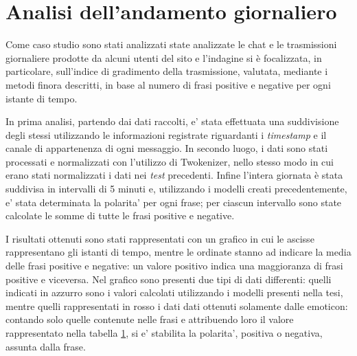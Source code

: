 \documentclass[a4paper,12pt,openright,twoside]{report}
\theoremstyle{definition}
\begin{document}

\section{Analisi dell'andamento giornaliero}
Come caso studio sono stati analizzati state analizzate le chat e le trasmissioni giornaliere prodotte da alcuni utenti
del sito
e l’indagine si è focalizzata, in particolare, sull’indice di gradimento della trasmissione,  valutata, mediante i metodi finora descritti, in base al numero di frasi positive e negative per ogni istante di tempo.

In prima analisi, partendo dai dati raccolti, e' stata effettuata una suddivisione degli stessi utilizzando
le informazioni registrate riguardanti i \emph{timestamp} e il canale di appartenenza di ogni messaggio.
In secondo luogo, i dati sono stati processati e normalizzati con l'utilizzo di Twokenizer, nello stesso modo
in cui erano stati normalizzati i dati nei \emph{test} precedenti.
Infine l'intera giornata è stata suddivisa in intervalli di 5 minuti e, utilizzando i modelli
creati precedentemente, e' stata determinata la polarita' per ogni frase; per ciascun intervallo sono state calcolate le 
somme di tutte le frasi positive e negative.

I risultati ottenuti sono stati rappresentati con un grafico in cui le ascisse rappresentano gli
istanti di tempo, mentre le ordinate stanno ad indicare la media delle frasi positive e negative:
un valore positivo indica
una maggioranza di frasi positive e viceversa.
Nel grafico sono presenti due tipi di dati differenti: quelli indicati in azzurro sono i valori calcolati
utilizzando i modelli presenti nella tesi, mentre quelli rappresentati in rosso  i dati dati ottenuti solamente
dalle emoticon: contando 
solo quelle contenute nelle frasi e attribuendo loro il valore rappresentato
nella tabella \ref{}, si e' stabilita la polarita', positiva o negativa, assunta dalla frase.
\end{document}
